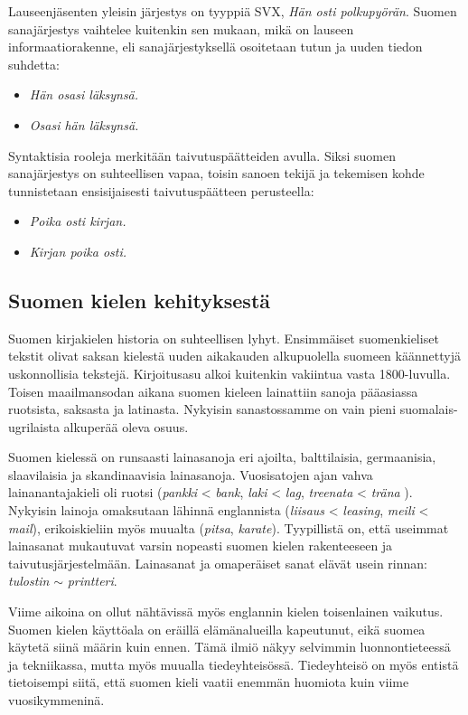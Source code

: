 \documentclass[]{../../metanetpaper}
\begin{document}
\begin{multicols}{2}
Lauseenjäsenten yleisin järjestys on tyyppiä SVX, \textit{Hän osti polkupyörän}. Suomen
sanajärjestys vaihtelee kuitenkin sen mukaan, mikä on lauseen
informaatiorakenne, eli sanajärjestyksellä osoitetaan tutun ja uuden tiedon
suhdetta:
\begin{itemize}
\item \textit{Hän osasi läksynsä.}

\item \textit{Osasi hän läksynsä.}
\end{itemize}

Syntaktisia rooleja merkitään taivutuspäätteiden avulla. Siksi suomen
sanajärjestys on suhteellisen vapaa, toisin sanoen tekijä ja tekemisen kohde
tunnistetaan ensisijaisesti taivutuspäätteen perusteella:
\begin{itemize}
\item \textit{Poika osti kirjan.}

\item \textit{Kirjan poika osti.}
\end{itemize}



\subsection{Suomen kielen kehityksestä}


Suomen kirjakielen historia on suhteellisen lyhyt. Ensimmäiset suomenkieliset
tekstit olivat saksan kielestä uuden aikakauden alkupuolella suomeen
käännettyjä uskonnollisia tekstejä. Kirjoitusasu alkoi kuitenkin vakiintua
vasta 1800-luvulla. Toisen maailmansodan aikana suomen kieleen lainattiin
sanoja pääasiassa ruotsista, saksasta ja latinasta. Nykyisin sanastossamme on
vain pieni suomalais-ugrilaista alkuperää oleva osuus.

Suomen kielessä on runsaasti lainasanoja eri ajoilta, balttilaisia,
germaanisia, slaavilaisia ja skandinaavisia lainasanoja. Vuosisatojen
ajan vahva lainanantajakieli oli ruotsi (\textit{pankki} <
\textit{bank}, \textit{laki} < \textit{lag}, \textit{treenata} <
\textit{träna} ). Nykyisin lainoja omaksutaan lähinnä englannista
(\textit{liisaus} < \textit{leasing}, \textit{meili} < \textit{mail}),
erikoiskieliin myös muualta (\textit{pitsa},
\textit{karate}). Tyypillistä on, että useimmat lainasanat mukautuvat
varsin nopeasti suomen kielen rakenteeseen ja
taivutusjärjestelmään. Lainasanat ja omaperäiset sanat elävät usein
rinnan: \textit{tulostin} $\sim$ \textit{printteri}.

Viime aikoina on ollut nähtävissä myös englannin kielen toisenlainen vaikutus.
Suomen kielen käyttöala on eräillä elämänalueilla kapeutunut, eikä suomea
käytetä siinä määrin kuin ennen. Tämä ilmiö näkyy selvimmin luonnontieteessä ja
tekniikassa, mutta myös muualla tiedeyhteisössä. Tiedeyhteisö on myös entistä
tietoisempi siitä, että suomen kieli vaatii enemmän huomiota kuin viime
vuosikymmeninä.


\end{multicols}
\end{document}
